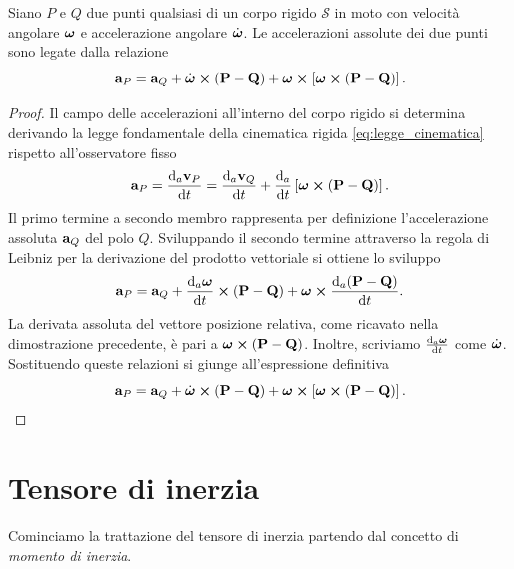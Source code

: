 \begin{theorem}
    Siano $P$ e $Q$ due punti qualsiasi di un corpo rigido $\mathcal{S}$ in moto con velocità angolare $\vb*{\omega}$ e accelerazione angolare $\dot{\vb*{\omega}}$. Le accelerazioni assolute dei due punti sono legate dalla relazione
    \begin{equation}
        \vb{a}_P = \vb{a}_Q + \dot{\vb*{\omega}} \cross (\vb{P} - \vb{Q}) + \vb*{\omega} \cross \left[ \vb*{\omega} \cross (\vb{P} - \vb{Q}) \right].
    \end{equation}
\end{theorem}

\begin{proof}
    Il campo delle accelerazioni all'interno del corpo rigido si determina derivando la legge fondamentale della cinematica rigida \eqref{eq:legge_cinematica} rispetto all'osservatore fisso
    \begin{equation*}
        \vva_P = \dva{\vv_P}{t} = \dva{\vv_Q}{t} + \dva{t} \left[ \vb*{\omega} \cross (\vP - \vQ) \right].
    \end{equation*}
    Il primo termine a secondo membro rappresenta per definizione l'accelerazione assoluta $\vb{a}_Q$ del polo $Q$. Sviluppando il secondo termine attraverso la regola di Leibniz per la derivazione del prodotto vettoriale si ottiene lo sviluppo
    \begin{equation*}
        \vva_P = \vva_Q + \dva{\vb*{\omega}}{t} \cross (\vP - \vQ) + \vb*{\omega} \cross \dva{(\vP - \vQ)}{t}.
    \end{equation*}
    La derivata assoluta del vettore posizione relativa, come ricavato nella dimostrazione precedente, è pari a $\vb*{\omega} \cross (\vb{P} - \vb{Q})$. Inoltre, scriviamo $\dva{\vb*{\omega}}{t}$ come $\dot{\vb*{\omega}}$. Sostituendo queste relazioni si giunge all'espressione definitiva
    \begin{equation*}
        \vb{a}_P = \vb{a}_Q + \dot{\vb*{\omega}} \cross (\vb{P} - \vb{Q}) + \vb*{\omega} \cross \left[ \vb*{\omega} \cross (\vb{P} - \vb{Q}) \right].
    \end{equation*}
\end{proof}

\section{Tensore di inerzia}\label{sec:tensoreInerzia}
Cominciamo la trattazione del tensore di inerzia partendo dal concetto di \emph{momento di inerzia}.

